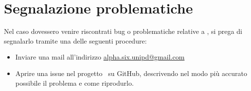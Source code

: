 \section{Segnalazione problematiche}

Nel caso dovessero venire riscontrati bug o problematiche relative a \progetto, si prega di segnalarlo tramite una delle seguenti procedure:
\begin{itemize}
    \item Inviare una mail all'indirizzo \href{mailto:alpha.six.unipd@gmail.com}{alpha.six.unipd@gmail.com}
    \item Aprire una issue nel progetto \progetto\ su GitHub, descrivendo nel modo più accurato possibile il problema e come riprodurlo.
\end{itemize}
